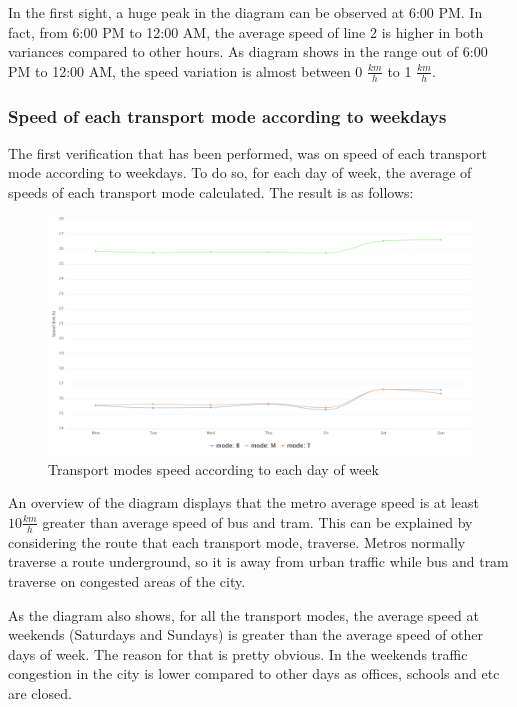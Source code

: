 \documentclass{article}
\begin{document}
In the first sight, a huge peak in the diagram can be observed at 6:00 PM. In fact, from 6:00 PM to 12:00 AM, the average speed of line 2 is higher in both variances compared to other hours. As diagram shows in the range out of 6:00 PM to 12:00 AM, the speed variation is almost between 0 $\frac{km}{h}$ to 1 $\frac{km}{h}$.





\subsubsection{Speed of each transport mode according to weekdays}
The first verification that has been performed, was on speed of each transport mode according to weekdays. To do so, for each day of week, the average of speeds of each transport mode calculated. The result is as follows: 
 \begin{figure}[H]
    \centering
    \includegraphics[width=\textwidth]{images/Speed_Day.png} 
    \caption{Transport modes speed according to each day of week}
\end{figure}
An overview of the diagram displays that the metro average speed is at least $10 \frac{km}{h}$ greater than average speed of bus and tram. This can be explained by considering the route that each transport mode, traverse. Metros normally traverse a route underground, so it is away from urban traffic while bus and tram traverse on congested areas of the city.

As the diagram also shows, for all the transport modes, the average speed at weekends (Saturdays and Sundays) is greater than the average speed of other days of week. The reason for that is pretty obvious. In the weekends traffic congestion in the city is lower compared to other days as offices, schools and etc are closed.
\end{document}
